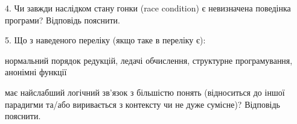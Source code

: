 \documentclass[12pt, ukrainian]{article}
\begin{document}
\begin {large}
{\vspace{5mm}
4. Чи завжди наслідком стану гонки (race condition) є невизначена поведінка програми? Відповідь пояснити.



\vspace{5mm}
5. Що з наведеного переліку (якщо таке в переліку є):

\vspace{4mm}
\qquad нормальний порядок редукцій, ледачі обчислення, структурне програмування, анонімні функції

\vspace{4mm}
має найслабший логічний зв’язок з більшістю понять (відноситься до іншої парадигми та/або виривається з контексту чи не дуже сумісне)? Відповідь пояснити.

}
\end {large}
\end{document}
